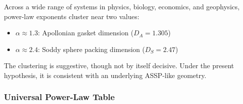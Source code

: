 \documentclass[11pt,a4paper]{article}
\begin{document}
Across a wide range of systems in physics, biology, economics, and geophysics, power-law exponents cluster near two values:
\begin{itemize}
  \item $\alpha\approx1.3$: Apollonian gasket dimension ($D_A=1.305$)
  \item $\alpha\approx2.4$: Soddy sphere packing dimension ($D_S=2.47$)
\end{itemize}

The clustering is suggestive, though not by itself decisive. Under the present hypothesis, it is consistent with an underlying ASSP-like geometry.

\subsubsection{Universal Power-Law Table}
\end{document}
